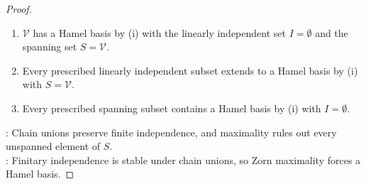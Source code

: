 \begin{theorem}
\begin{proof}
\begin{enumerate}[label=(\roman*)]
Therefore $S\subseteq\operatorname{span}(\mathcal{B})$, so $\operatorname{span}(\mathcal{B})=\mathcal{V}$ by $\operatorname{span}(S)=\mathcal{V}$. Thus $I\subseteq\mathcal{B}\subseteq S$, and $\mathcal{B}$ is a Hamel basis.
\item $\mathcal{V}$ has a Hamel basis by (i) with the linearly independent set $I=\emptyset$ and the spanning set $S=\mathcal{V}$.
\item Every prescribed linearly independent subset extends to a Hamel basis by (i) with $S=\mathcal{V}$.
\item Every prescribed spanning subset contains a Hamel basis by (i) with $I=\emptyset$.
\end{enumerate}
: Chain unions preserve finite independence, and maximality rules out every unspanned element of $S$.\\
: Finitary independence is stable under chain unions, so Zorn maximality forces a Hamel basis.
\end{proof}
\end{theorem}
